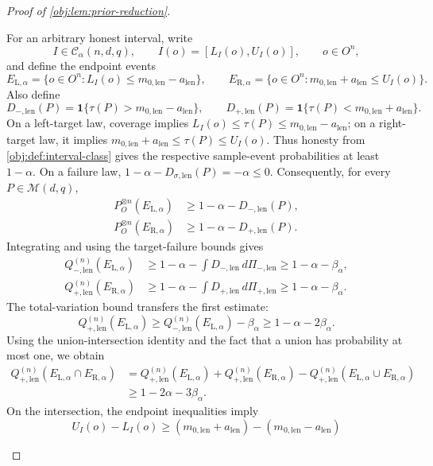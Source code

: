 \documentclass[11pt]{article}
\begin{document}
\begin{proof}[Proof of \cref{obj:lem:prior-reduction}]
\begin{enumerate}
For an arbitrary honest interval, write
\[
I\in\mathcal C_\alpha(n,d,q),
\qquad
I(o)=[L_I(o),U_I(o)],
\qquad o\in O^n,
\]
and define the endpoint events
\[
E_{\mathrm L,\alpha}
=\{o\in O^n:L_I(o)\le m_{0,\mathrm{len}}-a_{\mathrm{len}}\},
\qquad
E_{\mathrm R,\alpha}
=\{o\in O^n:m_{0,\mathrm{len}}+a_{\mathrm{len}}\le U_I(o)\}.
\]
Also define
\[
D_{-,\mathrm{len}}(P)
=\mathbf1\{\tau(P)>m_{0,\mathrm{len}}-a_{\mathrm{len}}\},
\qquad
D_{+,\mathrm{len}}(P)
=\mathbf1\{\tau(P)<m_{0,\mathrm{len}}+a_{\mathrm{len}}\}.
\]
On a left-target law, coverage implies
\(L_I(o)\le\tau(P)\le m_{0,\mathrm{len}}-a_{\mathrm{len}}\);
on a right-target law, it implies
\(m_{0,\mathrm{len}}+a_{\mathrm{len}}\le\tau(P)\le U_I(o)\).
Thus honesty from \cref{obj:def:interval-class} gives the respective
sample-event probabilities at least \(1-\alpha\).
On a failure law, \(1-\alpha-D_{\sigma,\mathrm{len}}(P)=-\alpha\le0\).
Consequently, for every \(P\in\mathcal M(d,q)\),
\[
\begin{aligned}
P_O^{\otimes n}(E_{\mathrm L,\alpha})
&\ge1-\alpha-D_{-,\mathrm{len}}(P),\\
P_O^{\otimes n}(E_{\mathrm R,\alpha})
&\ge1-\alpha-D_{+,\mathrm{len}}(P).
\end{aligned}
\]
Integrating and using the target-failure bounds gives
\[
\begin{aligned}
Q_{-,\mathrm{len}}^{(n)}(E_{\mathrm L,\alpha})
&\ge1-\alpha-\int D_{-,\mathrm{len}}\,d\Pi_{-,\mathrm{len}}
 \ge1-\alpha-\beta_\alpha,\\
Q_{+,\mathrm{len}}^{(n)}(E_{\mathrm R,\alpha})
&\ge1-\alpha-\int D_{+,\mathrm{len}}\,d\Pi_{+,\mathrm{len}}
 \ge1-\alpha-\beta_\alpha.
\end{aligned}
\]
The total-variation bound transfers the first estimate:
\[
Q_{+,\mathrm{len}}^{(n)}(E_{\mathrm L,\alpha})
\ge Q_{-,\mathrm{len}}^{(n)}(E_{\mathrm L,\alpha})-\beta_\alpha
\ge1-\alpha-2\beta_\alpha.
\]
Using the union-intersection identity and the fact that a union has
probability at most one, we obtain
\[
\begin{aligned}
Q_{+,\mathrm{len}}^{(n)}
 (E_{\mathrm L,\alpha}\cap E_{\mathrm R,\alpha})
&=
Q_{+,\mathrm{len}}^{(n)}(E_{\mathrm L,\alpha})
+Q_{+,\mathrm{len}}^{(n)}(E_{\mathrm R,\alpha})
-Q_{+,\mathrm{len}}^{(n)}
 (E_{\mathrm L,\alpha}\cup E_{\mathrm R,\alpha})\\
&\ge1-2\alpha-3\beta_\alpha.
\end{aligned}
\]
On the intersection, the endpoint inequalities imply
\[
U_I(o)-L_I(o)
\ge (m_{0,\mathrm{len}}+a_{\mathrm{len}})
   -(m_{0,\mathrm{len}}-a_{\mathrm{len}})
\]
\end{enumerate}
\end{proof}
\end{document}
